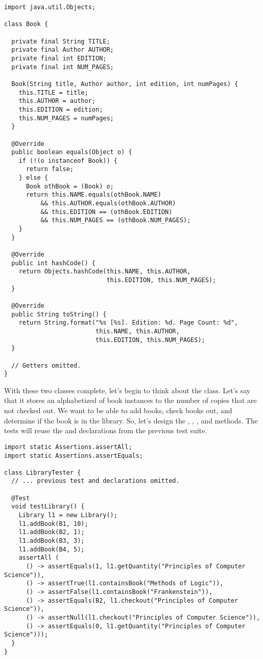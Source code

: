 \begin{lstlisting}[language=MyJava]
import java.util.Objects;

class Book {

  private final String TITLE;
  private final Author AUTHOR;
  private final int EDITION;
  private final int NUM_PAGES;

  Book(String title, Author author, int edition, int numPages) {
    this.TITLE = title;
    this.AUTHOR = author;
    this.EDITION = edition;
    this.NUM_PAGES = numPages;
  }

  @Override
  public boolean equals(Object o) {
    if (!(o instanceof Book)) {
      return false;
    } else {
      Book othBook = (Book) o;
      return this.NAME.equals(othBook.NAME)
          && this.AUTHOR.equals(othBook.AUTHOR)
          && this.EDITION == (othBook.EDITION)
          && this.NUM_PAGES == (othBook.NUM_PAGES);
    }
  }
  
  @Override
  public int hashCode() {
    return Objects.hashCode(this.NAME, this.AUTHOR, 
                            this.EDITION, this.NUM_PAGES);
  }

  @Override
  public String toString() {
    return String.format("%s [%s]. Edition: %d. Page Count: %d",
                         this.NAME, this.AUTHOR, 
                         this.EDITION, this.NUM_PAGES);
  }

  // Getters omitted.
}
\end{lstlisting}

\newpage %
With these two classes complete, let's begin to think about the  class. 
Let's say that it stores an alphabetized  of book instances to the number of copies that are not checked out. 
We want to be able to add books, check books out, and determine if the book is in the library.
So, let's design the , , , and  methods.
The tests will reuse the  and  declarations from the previous test suite.

\enlargethispage{-3\baselineskip}
\begin{lstlisting}[language=MyJava]
import static Assertions.assertAll;
import static Assertions.assertEquals;

class LibraryTester {
  // ... previous test and declarations omitted.

  @Test
  void testLibrary() {
    Library l1 = new Library();
    l1.addBook(B1, 10);
    l1.addBook(B2, 1);
    l1.addBook(B3, 3);
    l1.addBook(B4, 5);
    assertAll (
      () -> assertEquals(1, l1.getQuantity("Principles of Computer Science")),
      () -> assertTrue(l1.containsBook("Methods of Logic")),
      () -> assertFalse(l1.containsBook("Frankenstein")),
      () -> assertEquals(B2, l1.checkout("Principles of Computer Science")),
      () -> assertNull(l1.checkout("Principles of Computer Science")),
      () -> assertEquals(0, l1.getQuantity("Principles of Computer Science")));
  }
}
\end{lstlisting}


